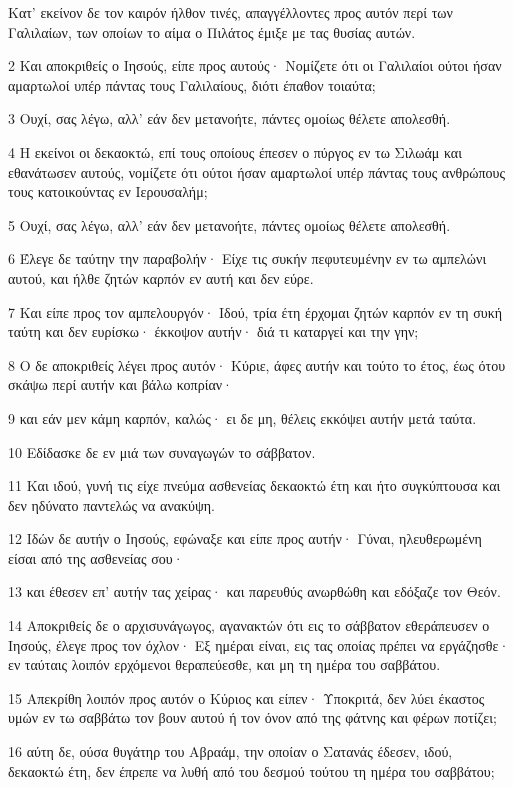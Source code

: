 \par Κατ' εκείνον δε τον καιρόν ήλθον τινές, απαγγέλλοντες προς αυτόν περί των Γαλιλαίων, των οποίων το αίμα ο Πιλάτος έμιξε με τας θυσίας αυτών.
\par 2 Και αποκριθείς ο Ιησούς, είπε προς αυτούς· Νομίζετε ότι οι Γαλιλαίοι ούτοι ήσαν αμαρτωλοί υπέρ πάντας τους Γαλιλαίους, διότι έπαθον τοιαύτα;
\par 3 Ουχί, σας λέγω, αλλ' εάν δεν μετανοήτε, πάντες ομοίως θέλετε απολεσθή.
\par 4 Η εκείνοι οι δεκαοκτώ, επί τους οποίους έπεσεν ο πύργος εν τω Σιλωάμ και εθανάτωσεν αυτούς, νομίζετε ότι ούτοι ήσαν αμαρτωλοί υπέρ πάντας τους ανθρώπους τους κατοικούντας εν Ιερουσαλήμ;
\par 5 Ουχί, σας λέγω, αλλ' εάν δεν μετανοήτε, πάντες ομοίως θέλετε απολεσθή.
\par 6 Έλεγε δε ταύτην την παραβολήν· Είχε τις συκήν πεφυτευμένην εν τω αμπελώνι αυτού, και ήλθε ζητών καρπόν εν αυτή και δεν εύρε.
\par 7 Και είπε προς τον αμπελουργόν· Ιδού, τρία έτη έρχομαι ζητών καρπόν εν τη συκή ταύτη και δεν ευρίσκω· έκκοψον αυτήν· διά τι καταργεί και την γην;
\par 8 Ο δε αποκριθείς λέγει προς αυτόν· Κύριε, άφες αυτήν και τούτο το έτος, έως ότου σκάψω περί αυτήν και βάλω κοπρίαν·
\par 9 και εάν μεν κάμη καρπόν, καλώς· ει δε μη, θέλεις εκκόψει αυτήν μετά ταύτα.
\par 10 Εδίδασκε δε εν μιά των συναγωγών το σάββατον.
\par 11 Και ιδού, γυνή τις είχε πνεύμα ασθενείας δεκαοκτώ έτη και ήτο συγκύπτουσα και δεν ηδύνατο παντελώς να ανακύψη.
\par 12 Ιδών δε αυτήν ο Ιησούς, εφώναξε και είπε προς αυτήν· Γύναι, ηλευθερωμένη είσαι από της ασθενείας σου·
\par 13 και έθεσεν επ' αυτήν τας χείρας· και παρευθύς ανωρθώθη και εδόξαζε τον Θεόν.
\par 14 Αποκριθείς δε ο αρχισυνάγωγος, αγανακτών ότι εις το σάββατον εθεράπευσεν ο Ιησούς, έλεγε προς τον όχλον· Εξ ημέραι είναι, εις τας οποίας πρέπει να εργάζησθε· εν ταύταις λοιπόν ερχόμενοι θεραπεύεσθε, και μη τη ημέρα του σαββάτου.
\par 15 Απεκρίθη λοιπόν προς αυτόν ο Κύριος και είπεν· Υποκριτά, δεν λύει έκαστος υμών εν τω σαββάτω τον βουν αυτού ή τον όνον από της φάτνης και φέρων ποτίζει;
\par 16 αύτη δε, ούσα θυγάτηρ του Αβραάμ, την οποίαν ο Σατανάς έδεσεν, ιδού, δεκαοκτώ έτη, δεν έπρεπε να λυθή από του δεσμού τούτου τη ημέρα του σαββάτου;
